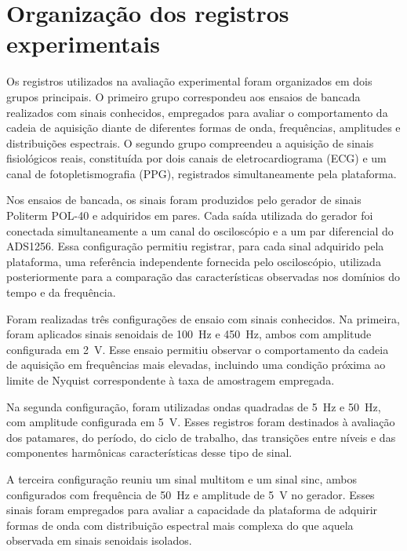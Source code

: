 \documentclass[a4paper,12pt]{fcte}
\begin{document}
\section{Organização dos registros experimentais}
\label{sec:organizacao_registros}

Os registros utilizados na avaliação experimental foram organizados em dois grupos principais. O primeiro grupo correspondeu aos ensaios de bancada realizados com sinais conhecidos, empregados para avaliar o comportamento da cadeia de aquisição diante de diferentes formas de onda, frequências, amplitudes e distribuições espectrais. O segundo grupo compreendeu a aquisição de sinais fisiológicos reais, constituída por dois canais de eletrocardiograma (ECG) e um canal de fotopletismografia (PPG), registrados simultaneamente pela plataforma.

Nos ensaios de bancada, os sinais foram produzidos pelo gerador de sinais Politerm POL-40 e adquiridos em pares. Cada saída utilizada do gerador foi conectada simultaneamente a um canal do osciloscópio e a um par diferencial do ADS1256. Essa configuração permitiu registrar, para cada sinal adquirido pela plataforma, uma referência independente fornecida pelo osciloscópio, utilizada posteriormente para a comparação das características observadas nos domínios do tempo e da frequência.

Foram realizadas três configurações de ensaio com sinais conhecidos. Na primeira, foram aplicados sinais senoidais de 100~Hz e 450~Hz, ambos com amplitude configurada em 2~V. Esse ensaio permitiu observar o comportamento da cadeia de aquisição em frequências mais elevadas, incluindo uma condição próxima ao limite de Nyquist correspondente à taxa de amostragem empregada.

Na segunda configuração, foram utilizadas ondas quadradas de 5~Hz e 50~Hz, com amplitude configurada em 5~V. Esses registros foram destinados à avaliação dos patamares, do período, do ciclo de trabalho, das transições entre níveis e das componentes harmônicas características desse tipo de sinal.

A terceira configuração reuniu um sinal multitom e um sinal sinc, ambos configurados com frequência de 50~Hz e amplitude de 5~V no gerador. Esses sinais foram empregados para avaliar a capacidade da plataforma de adquirir formas de onda com distribuição espectral mais complexa do que aquela observada em sinais senoidais isolados.
\end{document}
